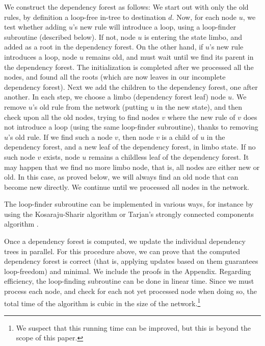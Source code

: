 We construct the dependency forest as follows: We start out with only the old rules, by definition a loop-free in-tree to destination $d$. Now, for each node $u$, we test whether adding $u$'s new rule will introduce a loop, using a loop-finder subroutine (described below). If not, node $u$ is entering the state limbo, and added as a root in the dependency forest. On the other hand, if $u$'s new rule introduces a loop, node $u$ remains old, and must wait until we find its parent in the dependency forest. The initialization is completed after we processed all the nodes, and found all the roots (which are now leaves in our incomplete dependency forest). Next we add the children to the dependency forest, one after another. In each step, we choose a limbo (dependency forest leaf) node $u$. We remove $u$'s old rule from the network (putting $u$ in the new state), and then check upon all the old nodes, trying to find nodes $v$ where the new rule of $v$ does not introduce a loop (using the same loop-finder subroutine), thanks to removing $u$'s old rule. If we find such a node $v$, then node $v$ is a child of $u$ in the dependency forest, and a new leaf of the dependency forest, in limbo state. If no such node $v$ exists, node $u$ remains a childless leaf of the dependency forest. It may happen that we find no more limbo node, that is, all nodes are either new or old. In this case, as proved below, we will always find an old node that can become new directly.
We continue until we processed all nodes in the network.

The loop-finder subroutine can be implemented in various ways, for instance by using the Kosaraju-Sharir algorithm or Tarjan's strongly connected components algorithm \cite{reference_1_in_http://en.wikipedia.org/wiki/Tarjan's_strongly_connected_components_algorithm}.




Once a dependency forest is computed, we update the individual dependency trees in parallel. For this procedure above, we can prove that the computed dependency forest is correct (that is, applying updates based on them guarantees loop-freedom) and minimal. We include the proofs in the Appendix. Regarding efficiency, the loop-finding subroutine can be done in linear time. Since we must process each node, and check for each not yet processed node when doing so, the total time of the algorithm is cubic in the size of the network.\footnote{We suspect that this running time can be improved, but this is beyond the scope of this paper.}


